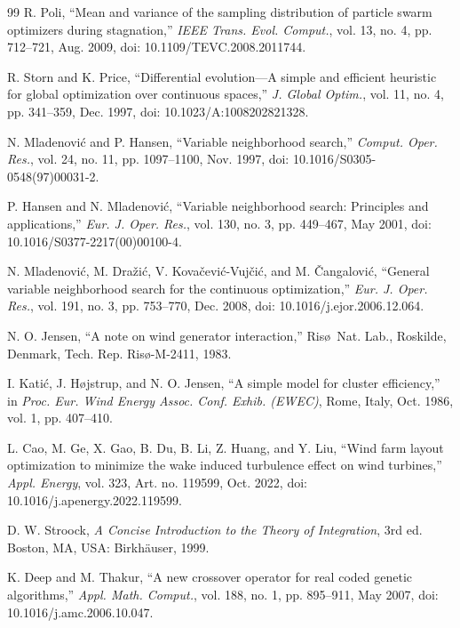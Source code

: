 \documentclass[journal,twoside]{IEEEtran}
\begin{document}
\begin{thebibliography}{99}
R. Poli, ``Mean and variance of the sampling distribution of particle swarm optimizers during stagnation,'' \textit{IEEE Trans. Evol. Comput.}, vol. 13, no. 4, pp. 712--721, Aug. 2009, doi: 10.1109/TEVC.2008.2011744.

R. Storn and K. Price, ``Differential evolution---A simple and efficient heuristic for global optimization over continuous spaces,'' \textit{J. Global Optim.}, vol. 11, no. 4, pp. 341--359, Dec. 1997, doi: 10.1023/A:1008202821328.

N. Mladenovi\'c and P. Hansen, ``Variable neighborhood search,'' \textit{Comput. Oper. Res.}, vol. 24, no. 11, pp. 1097--1100, Nov. 1997, doi: 10.1016/S0305-0548(97)00031-2.

P. Hansen and N. Mladenovi\'c, ``Variable neighborhood search: Principles and applications,'' \textit{Eur. J. Oper. Res.}, vol. 130, no. 3, pp. 449--467, May 2001, doi: 10.1016/S0377-2217(00)00100-4.

N. Mladenovi\'c, M. Dra\v{z}i\'c, V. Kova\v{c}evi\'c-Vuj\v{c}i\'c, and M. \v{C}angalovi\'c, ``General variable neighborhood search for the continuous optimization,'' \textit{Eur. J. Oper. Res.}, vol. 191, no. 3, pp. 753--770, Dec. 2008, doi: 10.1016/j.ejor.2006.12.064.

N. O. Jensen, ``A note on wind generator interaction,'' Ris\o\ Nat. Lab., Roskilde, Denmark, Tech. Rep. Ris\o-M-2411, 1983.

I. Kati\'c, J. H\o jstrup, and N. O. Jensen, ``A simple model for cluster efficiency,'' in \textit{Proc. Eur. Wind Energy Assoc. Conf. Exhib. (EWEC)}, Rome, Italy, Oct. 1986, vol. 1, pp. 407--410.

L. Cao, M. Ge, X. Gao, B. Du, B. Li, Z. Huang, and Y. Liu, ``Wind farm layout optimization to minimize the wake induced turbulence effect on wind turbines,'' \textit{Appl. Energy}, vol. 323, Art. no. 119599, Oct. 2022, doi: 10.1016/j.apenergy.2022.119599.

D. W. Stroock, \textit{A Concise Introduction to the Theory of Integration}, 3rd ed. Boston, MA, USA: Birkh\"auser, 1999.

K. Deep and M. Thakur, ``A new crossover operator for real coded genetic algorithms,'' \textit{Appl. Math. Comput.}, vol. 188, no. 1, pp. 895--911, May 2007, doi: 10.1016/j.amc.2006.10.047.


\end{thebibliography}
\end{document}

